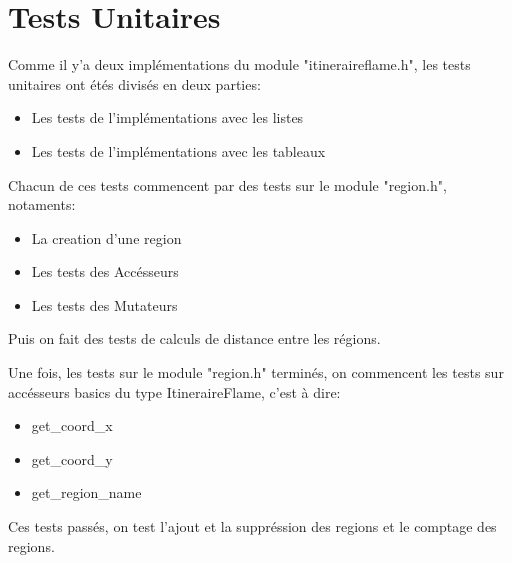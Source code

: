 \section{Tests Unitaires}\label{tests}
Comme il y'a deux implémentations du module "itineraireflame.h", les tests unitaires ont étés
divisés en deux parties:
\begin{itemize}
    \item Les tests de l'implémentations avec les listes
    \item Les tests de l'implémentations avec les tableaux
\end{itemize}
Chacun de ces tests commencent par des tests sur le module "region.h", notaments:
\begin{itemize}
    \item La creation d'une region
    \item Les tests des Accésseurs
    \item Les tests des Mutateurs
\end{itemize}
Puis on fait des tests de calculs de distance entre les régions.

Une fois, les tests sur le module "region.h" terminés, on commencent les tests sur accésseurs basics 
du type ItineraireFlame, c'est à dire:
\begin{itemize}
    \item get\_coord\_x
    \item get\_coord\_y
    \item get\_region\_name
\end{itemize}
Ces tests passés, on test l'ajout et la suppréssion des regions et le comptage des regions.